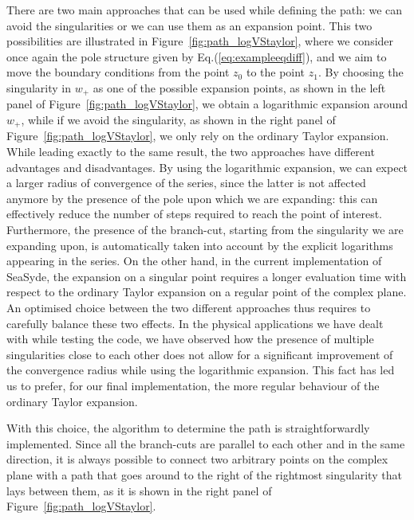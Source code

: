 There are two main approaches that can be used while defining the path: we can avoid the singularities or we can use them as an expansion point.
This two possibilities are illustrated in Figure~\ref{fig:path_logVStaylor}, where we consider once again the pole structure given by Eq.(\ref{eq:exampleeqdiff}), and we aim to move the boundary conditions from the point $z_0$ to the point $z_1$.
By choosing the singularity in $w_+$ as one of the possible expansion points, as shown in the left panel of Figure~\ref{fig:path_logVStaylor}, we obtain a logarithmic expansion around $w_+$, while if we avoid the singularity, as shown in the right panel of Figure~\ref{fig:path_logVStaylor}, we only rely on the ordinary Taylor expansion.
While leading exactly to the same result, the two approaches have different advantages and disadvantages.
By using the logarithmic expansion, we can expect a larger radius of convergence of the series, since the latter is not affected anymore by the presence of the pole upon which we are expanding: this can effectively reduce the number of steps required to reach the point of interest.
Furthermore, the presence of the branch-cut, starting from the singularity we are expanding upon, is automatically taken into account by the explicit logarithms appearing in the series.
On the other hand, in the current implementation of {\sc SeaSyde}, the expansion on a singular point requires a longer evaluation time with respect to the ordinary Taylor expansion on a regular point of the complex plane.
An optimised choice between the two different approaches thus requires to carefully balance these two effects.
In the physical applications we have dealt with while testing the code, we have observed how the presence of multiple singularities close to each other does not allow for a significant improvement of the convergence radius while using the logarithmic expansion. This fact has led us to prefer, for our final implementation, the more regular behaviour of the ordinary Taylor expansion.

With this choice, the algorithm to determine the path is straightforwardly implemented.
Since all the branch-cuts are parallel to each other and in the same direction, it is always possible to connect two arbitrary points on the complex plane with a path that goes around to the right of the rightmost singularity that lays between them, as it is shown in the right panel of Figure~\ref{fig:path_logVStaylor}. 

